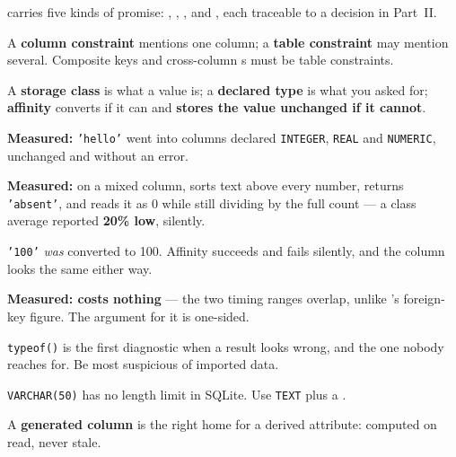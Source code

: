 \begin{chaptersummary}
\begin{tight}
  \item {} carries five kinds of promise: , , ,  and
        , each traceable to a decision in Part~II.
  \item A \textbf{column constraint} mentions one column; a \textbf{table
        constraint} may mention several. Composite keys and cross-column
        s must be table constraints.
  \item A \textbf{storage class} is what a value is; a \textbf{declared type}
        is what you asked for; \textbf{affinity} converts if it can and
        \textbf{stores the value unchanged if it cannot}.
  \item \textbf{Measured:} \texttt{'hello'} went into columns declared
        \texttt{INTEGER}, \texttt{REAL} and \texttt{NUMERIC}, unchanged and
        without an error.
  \item \textbf{Measured:} on a mixed column,  sorts text above
        every number,  returns \texttt{'absent'}, and 
        reads it as 0 while still dividing by the full count --- a class
        average reported \textbf{20\% low}, silently.
  \item \texttt{'100'} \emph{was} converted to 100. Affinity succeeds and fails
        silently, and the column looks the same either way.
  \item \textbf{Measured:  costs nothing} --- the two timing
        ranges overlap, unlike 's foreign-key figure. The
        argument for it is one-sided.
  \item \texttt{typeof()} is the first diagnostic when a result looks wrong,
        and the one nobody reaches for. Be most suspicious of imported data.
  \item \texttt{VARCHAR(50)} has no length limit in SQLite. Use \texttt{TEXT}
        plus a .
  \item A \textbf{ generated column} is the right home for a
        derived attribute: computed on read, never stale.
\end{tight}
\end{chaptersummary}

